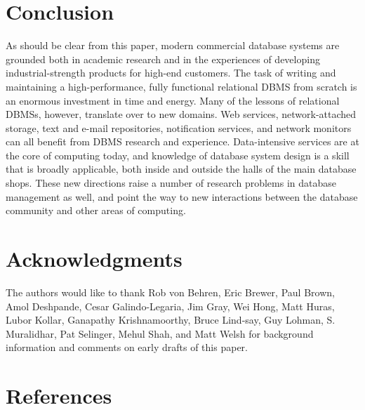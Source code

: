 \documentclass[a4paper,11pt,twoside,openright]{book}
\begin{document}
\hypertarget{conclusion}{%
\chapter{Conclusion}\label{conclusion}}

As should be clear from this paper, modern commercial database systems
are grounded both in academic research and in the experiences of
developing industrial-strength products for high-end customers. The task
of writing and maintaining a high-performance, fully functional
relational DBMS from scratch is an enormous investment in time and
energy. Many of the lessons of relational DBMSs, however, translate over
to new domains. Web services, network-attached storage, text and e-mail
repositories, notification services, and network monitors can all
benefit from DBMS research and experience. Data-intensive services are
at the core of computing today, and knowledge of database system design
is a skill that is broadly applicable, both inside and outside the halls
of the main database shops. These new directions raise a number of
research problems in database management as well, and point the way to
new interactions between the database community and other areas of
computing.

\hypertarget{acknowledgments}{%
\chapter*{Acknowledgments}\label{acknowledgments}}

The authors would like to thank Rob von Behren, Eric Brewer, Paul Brown,
Amol Deshpande, Cesar Galindo-Legaria, Jim Gray, Wei Hong, Matt Huras,
Lubor Kollar, Ganapathy Krishnamoorthy, Bruce Lind-say, Guy Lohman, S.
Muralidhar, Pat Selinger, Mehul Shah, and Matt Welsh for background
information and comments on early drafts of this paper.

\hypertarget{references}{%
\chapter*{References}\label{references}}
\end{document}
